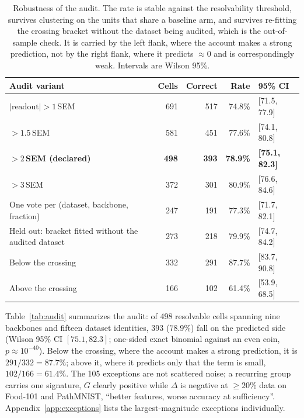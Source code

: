 \begin{table}[t]
\caption{Robustness of the audit. The rate is stable against the
resolvability threshold, survives clustering on the units that share a
baseline arm, and survives re-fitting the crossing bracket without the
dataset being audited, which is the out-of-sample check. It is carried by
the left flank, where the account makes a strong prediction, not by the
right flank, where it predicts ${\approx}0$ and is correspondingly weak.
Intervals are Wilson 95\%.}
\label{tab:robust}
\centering\scriptsize
\setlength{\tabcolsep}{2.6pt}
\begin{tabular}{@{}P{0.30\columnwidth}rrrP{0.20\columnwidth}@{}}
\toprule
Audit variant & Cells & Correct & Rate & 95\% CI \\
\midrule
$|\mathrm{readout}| > 1$\,SEM & 691 & 517 & 74.8\% & [71.5, 77.9] \\
$>1.5$\,SEM & 581 & 451 & 77.6\% & [74.1, 80.8] \\
\textbf{$>2$\,SEM (declared)} & \textbf{498} & \textbf{393} & \textbf{78.9\%} & \textbf{[75.1, 82.3]} \\
$>3$\,SEM & 372 & 301 & 80.9\% & [76.6, 84.6] \\
\midrule
One vote per (dataset, backbone, fraction) & 247 & 191 & 77.3\% & [71.7, 82.1] \\
Held out: bracket fitted without the audited dataset & 273 & 218 & 79.9\% & [74.7, 84.2] \\
\midrule
Below the crossing & 332 & 291 & 87.7\% & [83.7, 90.8] \\
Above the crossing & 166 & 102 & 61.4\% & [53.9, 68.5] \\
\bottomrule
\end{tabular}
\end{table}

Table~\ref{tab:audit} summarizes the audit: of 498 resolvable cells
spanning nine backbones and fifteen dataset identities, 393 ($78.9\%$)
fall on the predicted side (Wilson 95\% CI $[75.1, 82.3]$; one-sided exact
binomial against an even coin, $p \approx 10^{-40}$). Below the crossing,
where the account makes a strong prediction, it is $291/332 = 87.7\%$;
above it, where it predicts only that the term is small, $102/166 =
61.4\%$. The 105 exceptions are not scattered noise;
a recurring group carries one signature, $G$ clearly positive while
$\Delta$ is negative at ${\geq}20\%$ data on Food-101 and PathMNIST,
``better features, worse accuracy at sufficiency''.
Appendix~\ref{app:exceptions} lists the largest-magnitude exceptions
individually.

